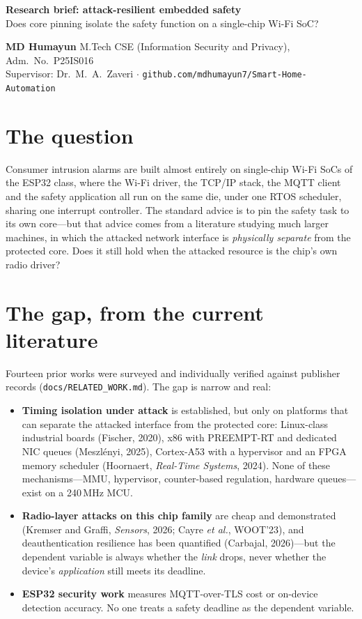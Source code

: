 \documentclass[10pt]{article}
\begin{document}
{\LARGE\bfseries Research brief: attack-resilient embedded safety}\\[0.3em]
{\large Does core pinning isolate the safety function on a single-chip Wi-Fi SoC?}

\vspace{0.4em}
\textbf{MD Humayun} \quad M.Tech CSE (Information Security and Privacy), Adm.\ No.\ P25IS016\\
Supervisor: Dr.\ M.\ A.\ Zaveri \quad $\cdot$ \quad
\texttt{github.com/mdhumayun7/Smart-Home-Automation}

\section{The question}
Consumer intrusion alarms are built almost entirely on single-chip Wi-Fi SoCs of the ESP32 class,
where the Wi-Fi driver, the TCP/IP stack, the MQTT client and the safety application all run on the
same die, under one RTOS scheduler, sharing one interrupt controller. The standard advice is to pin
the safety task to its own core---but that advice comes from a literature studying much larger
machines, in which the attacked network interface is \emph{physically separate} from the protected
core. Does it still hold when the attacked resource is the chip's own radio driver?

\section{The gap, from the current literature}
Fourteen prior works were surveyed and individually verified against publisher records
(\texttt{docs/RELATED\_WORK.md}). The gap is narrow and real:

\begin{itemize}[leftmargin=1.2em,itemsep=0.15em,topsep=0.2em]
\item \textbf{Timing isolation under attack} is established, but only on platforms that can
separate the attacked interface from the protected core: Linux-class industrial boards
(Fischer, 2020), x86 with PREEMPT-RT and dedicated NIC queues (Meszl\'enyi, 2025), Cortex-A53 with
a hypervisor and an FPGA memory scheduler (Hoornaert, \emph{Real-Time Systems}, 2024). None of
these mechanisms---MMU, hypervisor, counter-based regulation, hardware queues---exist on a
240\,MHz MCU.
\item \textbf{Radio-layer attacks on this chip family} are cheap and demonstrated (Kremser and
Graffi, \emph{Sensors}, 2026; Cayre \emph{et al.}, WOOT'23), and deauthentication resilience has
been quantified (Carbajal, 2026)---but the dependent variable is always whether the \emph{link}
drops, never whether the device's \emph{application} still meets its deadline.
\item \textbf{ESP32 security work} measures MQTT-over-TLS cost or on-device detection accuracy.
No one treats a safety deadline as the dependent variable.
\end{itemize}
\end{document}
